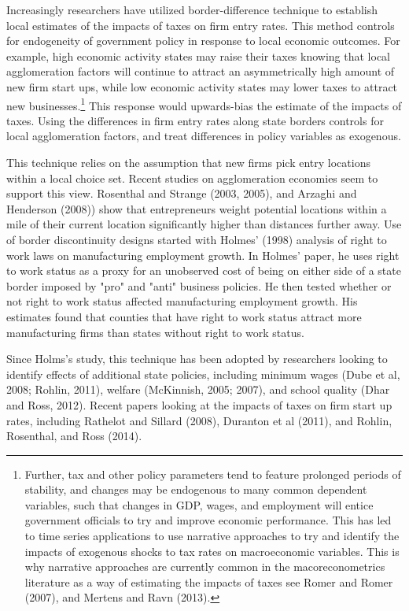 \documentclass[12pt,a4paper]{article}
\begin{document}
Increasingly researchers have utilized border-difference technique to establish local estimates of the impacts of taxes on firm entry rates. This method controls for endogeneity of government policy in response to local economic outcomes. For example, high economic activity states may raise their taxes knowing that local agglomeration factors will continue to attract an asymmetrically high amount of new firm start ups, while low economic activity states may lower taxes to attract new businesses.\footnote{Further, tax and other policy parameters tend to feature prolonged periods of stability, and changes may be endogenous to many common dependent variables, such that changes in GDP, wages, and employment will entice government officials to try and improve economic performance. This has led to time series applications to use narrative approaches to try and identify the impacts of exogenous shocks to tax rates on macroeconomic variables. This is why narrative approaches are currently common in the macoreconometrics literature as a way of estimating the impacts of taxes see Romer and Romer (2007), and Mertens and Ravn (2013).} This response would upwards-bias the estimate of the impacts of taxes. Using the differences in firm entry rates along state borders controls for local agglomeration factors, and treat differences in policy variables as exogenous.

This technique relies on the assumption that new firms pick entry locations within a local choice set. Recent studies on agglomeration economies seem to support this view.  Rosenthal and Strange (2003, 2005), and Arzaghi and Henderson (2008)) show that entrepreneurs weight potential locations within a mile of their current location significantly higher than distances further away. Use of border discontinuity designs started with Holmes’ (1998) analysis of right to work laws on manufacturing employment growth. In Holmes' paper, he uses right to work status as a proxy for an unobserved cost of being on either side of a state border imposed by "pro" and "anti" business policies. He then tested whether or not right to work status affected manufacturing employment growth. His estimates found that counties that have right to work status attract more manufacturing firms than states without right to work status.

Since Holms's study, this technique has been adopted by researchers looking to identify effects of additional state policies, including minimum wages (Dube et al, 2008; Rohlin, 2011), welfare (McKinnish, 2005; 2007), and school quality (Dhar and Ross, 2012). Recent papers looking at the impacts of taxes on firm start up rates, including Rathelot and Sillard (2008), Duranton et al (2011), and Rohlin, Rosenthal, and Ross (2014). 
\end{document}

